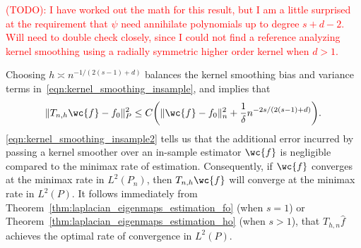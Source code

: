 \documentclass{article}
\newcommand{\1}{\mathbf{1}}
\newcommand{\wh}[1]{\widehat{#1}}
\theoremstyle{alden}
\theoremstyle{aldenthm}
\theoremstyle{definition}
\theoremstyle{remark}
\begin{document}
\textcolor{red}{(TODO): I have worked out the math for this result, but I am a little surprised at the requirement that $\psi$ need annihilate polynomials up to degree $s + d - 2$. Will need to double check closely, since I could not find a reference analyzing kernel smoothing using a radially symmetric higher order kernel when $d > 1$.}

Choosing $h \asymp n^{-1/(2(s - 1) + d)}$ balances the kernel smoothing bias and variance terms in~\eqref{eqn:kernel_smoothing_insample}, and implies that
\begin{equation}
\label{eqn:kernel_smoothing_insample2}
\|T_{n,h}\wc{f} - f_0\|_P^2 \leq C\biggl(\|\wc{f} - f_0\|_n^2 + \frac{1}{\delta}n^{-2s/(2(s - 1) + d)}\biggr).
\end{equation}
\eqref{eqn:kernel_smoothing_insample2} tells us that the additional error incurred by passing a kernel smoother over an in-sample estimator $\wc{f}$ is negligible compared to the minimax rate of estimation. Consequently, if $\wc{f}$ converges at the minimax rate in $L^2(P_n)$, then $T_{n,h}\wc{f}$ will converge at the minimax rate in $L^2(P)$. It follows immediately from Theorem~\ref{thm:laplacian_eigenmaps_estimation_fo} (when $s = 1$) or Theorem~\ref{thm:laplacian_eigenmaps_estimation_ho} (when $s > 1$), that $T_{h,n}\wh{f}$ achieves the optimal rate of convergence in $L^2(P)$.
\end{document}
